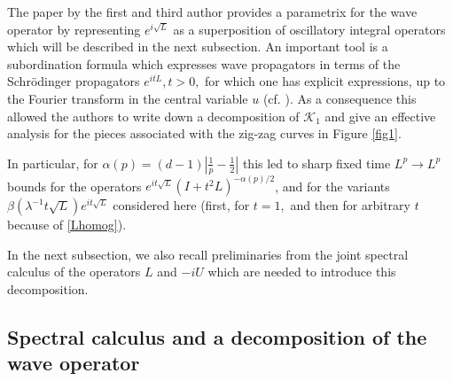 \documentclass[leqno]{amsart}
\theoremstyle{definition}
\theoremstyle{remark}
\numberwithin{equation}{section}
\newcommand\la{{\lambda}}
\newcommand\sK{{\mathscr {K}}}
\begin{document}
\medskip

The paper \cite{MuellerSeeger2015} by the first and third author provides a parametrix for the wave operator by representing $e^{i\sqrt L}$  as a superposition of oscillatory integral operators which  will be described in the next subsection. An important tool is a subordination formula which expresses wave propagators in terms of the Schrödinger   propagators $e^{it L}, t>0,$ for which one has explicit expressions, up to the Fourier transform in the central variable $u$ (cf. \cite{Gaveau77, MuellerRicci-Inv90}). 
As a consequence this allowed  the authors to write down a decomposition of $\sK_1$   and give an effective 
analysis for the pieces associated with the zig-zag curves in Figure \ref{fig1}. 

In particular, for $\alpha(p)=(d-1)|\frac1p-\frac12|$ this led to 
sharp fixed time $L^p\to L^p$ bounds for  the operators  $e^{it\sqrt L} (I+t^2L)^{-\alpha(p)/2} $, and for the variants $\beta (\la^{-1}t\sqrt L) e^{it \sqrt L} $ considered here (first, for $t=1,$  and then for arbitrary $t$ because of \eqref{Lhomog}). 
\smallskip

In the next subsection,  we also recall preliminaries from the joint spectral calculus  of the operators $L$ and  $-iU$ which are needed to introduce this decomposition.  


\subsection{Spectral calculus and a decomposition of the wave operator}
\end{document}
